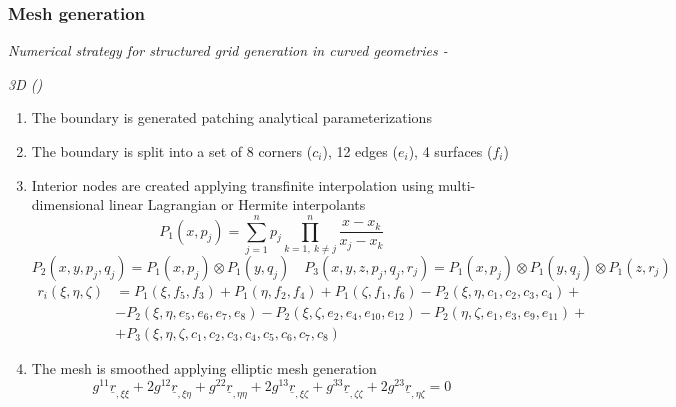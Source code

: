 \documentclass[first,firstsupp,lastsupp,handout,last,hyperref,table]{ETHclass}
\begin{document}
\begin{frame}[label=3D_gen]
\frametitle{Mesh generation}
\vspace{-0.15cm}
\centering
{\footnotesize
\textit{Numerical strategy for structured grid generation in curved geometries - }}
{\scriptsize
\textit{3D (\hyperlink{2D_gen}{})}
\vspace{0.15cm}
\begin{enumerate}
\item The boundary is generated patching analytical parameterizations
\item The boundary is split into a set of 8 corners ($c_{i}$), 12 edges ($e_{i}$), 4 surfaces ($f_{i}$)
\item Interior nodes are created applying transfinite interpolation using multi-dimensional linear Lagrangian or Hermite interpolants
\begin{equation*}
P_{1}(x,p_{j})=\sum_{j=1}^{n}p_{j}\prod_{k=1,\ k\neq j}^{n}\frac{x-x_{k}}{x_{j}-x_{k}}
\end{equation*}
\begin{equation*}
P_{2}(x,y,p_{j},q_{j})=P_{1}(x,p_{j})\otimes P_{1}(y,q_{j})\quad P_{3}(x,y,z,p_{j},q_{j},r_{j})=P_{1}(x,p_{j})\otimes P_{1}(y,q_{j})\otimes P_{1}(z,r_{j})
\end{equation*}
\begin{equation*}
\begin{split}
r_{i}(\xi,\eta,\zeta)&=P_{1}(\xi,f_{5},f_{3})+P_{1}(\eta,f_{2},f_{4})+P_{1}(\zeta,f_{1},f_{6})- P_{2}(\xi,\eta,c_{1},c_{2},c_{3},c_{4})+\\&- P_{2}(\xi,\eta,e_{5},e_{6},e_{7},e_{8})- P_{2}(\xi,\zeta,e_{2},e_{4},e_{10},e_{12})- P_{2}(\eta,\zeta,e_{1},e_{3},e_{9},e_{11})+\\&+P_{3}(\xi,\eta,\zeta,c_{1},c_{2},c_{3},c_{4},c_{5},c_{6},c_{7},c_{8})
\end{split}
\end{equation*}
\item The mesh is smoothed applying elliptic mesh generation
\begin{equation*}
g^{11}\underline{r}_{,\xi\xi}+2g^{12}\underline{r}_{,\xi\eta}+g^{22}\underline{r}_{,\eta\eta}+2g^{13}\underline{r}_{,\xi\zeta}+g^{33}\underline{r}_{,\zeta\zeta}+2g^{23}\underline{r}_{,\eta\zeta}=0
\end{equation*}
\end{enumerate}
}
\end{frame}

\end{document}
